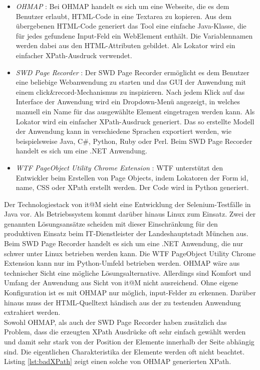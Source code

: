 \begin{itemize}
\item \textit{OHMAP} \cite{virtuetech_gmbh_ohmap_2015}: Bei OHMAP handelt es sich um eine Webseite, die es dem Benutzer erlaubt, HTML-Code in eine Textarea zu kopieren. Aus dem übergebenen HTML-Code generiert das Tool eine einfache Java-Klasse, die für jedes gefundene Input-Feld ein WebElement enthält. Die Variablennamen werden dabei aus den HTML-Attributen gebildet. Als Lokator wird ein einfacher XPath-Ausdruck verwendet.
	
\item \textit{SWD Page Recorder} \cite{dmytro_zharii_dzharii/swd-recorder_2015}: Der SWD Page Recorder ermöglicht es dem Benutzer eine beliebige Webanwendung zu starten und das GUI der Anwendung mit einem \grq click\&record\grq-Mechanismus zu inspizieren.
Nach jedem Klick auf das Interface der Anwendung wird ein Dropdown-Menü angezeigt, in welches manuell ein Name für das ausgewählte Element eingetragen werden kann. Als Lokator wird ein einfacher XPath-Ausdruck generiert.
Das so erstellte Modell der Anwendung kann in verschiedene Sprachen exportiert werden, wie beispielsweise Java, C\#, Python, Ruby oder Perl. Beim SWD Page Recorder handelt es sich um eine .NET Anwendung.

\item\textit{ WTF PageObject Utility Chrome Extension} \cite{daniel_wiredrive/wtframework_2015}: WTF unterstützt den Entwickler beim Erstellen von Page Objects, indem Lokatoren der Form id, name, CSS oder XPath erstellt werden. Der Code wird in Python generiert.
	
\end{itemize}

Der Technologiestack von it@M sieht eine Entwicklung der Selenium-Testfälle in Java vor. Als Betriebssystem kommt darüber hinaus Linux zum Einsatz.
Zwei der genannten Lösungsansätze scheiden mit dieser Einschränkung für den produktiven Einsatz beim IT-Dienstleister der Landeshauptstadt München aus. Beim SWD Page Recorder handelt es sich um eine .NET Anwendung, die nur schwer unter Linux betrieben werden kann. Die WTF PageObject Utility Chrome Extension kann nur im Python-Umfeld betrieben werden. OHMAP wäre aus technischer Sicht eine mögliche Lösungsalternative. Allerdings sind Komfort und Umfang der Anwendung aus Sicht von it@M nicht ausreichend. Ohne eigene Konfiguration ist es mit OHMAP nur möglich, input-Felder zu erkennen.
Darüber hinaus muss der HTML-Quelltext händisch aus der zu testenden Anwendung extrahiert werden. \\
Sowohl OHMAP, als auch der SWD Page Recorder haben zusätzlich das Problem, dass die erzeugten XPath Ausdrücke oft sehr einfach gewählt werden und damit sehr stark von der Position der Elemente innerhalb der Seite abhängig sind. Die eigentlichen Charakteristika der Elemente werden oft nicht beachtet. Listing \ref{lst:badXPath}
zeigt einen solche von OHMAP generierten XPath.

